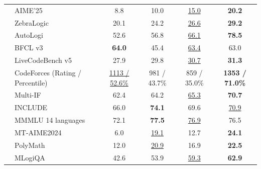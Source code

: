 \begin{table}[tbp]
{\begin{tabular}{@{}clcccc@{}}
& AIME'25 & 8.8 & 10.0 & \underline{15.0} & \textbf{20.2} \\
& ZebraLogic & 20.1 & 24.2 & \underline{26.6} & \textbf{29.2} \\
& AutoLogi & 52.6 & 56.8 & \underline{66.1} & \textbf{78.5} \\
\midrule
{} & BFCL v3 & \textbf{64.0} & 45.4 & \underline{63.4} & 63.0 \\
& LiveCodeBench v5 & 27.9 & 29.8 & \underline{30.7} & \textbf{31.3} \\
& CodeForces {\tiny{(Rating / Percentile)}} & \underline{1113 / 52.6\%} & 981 / 43.7\% & 859 / 35.0\% & \textbf{1353 / 71.0\%} \\
\midrule
{} & Multi-IF & 62.4 & 64.2 & \underline{65.3} & \textbf{70.7} \\
& INCLUDE & 66.0 & \textbf{74.1} & 69.6 & \underline{70.9} \\
& MMMLU {\tiny{14 languages}} & 72.1 & \textbf{77.5} & \underline{76.9} & 76.5 \\
& MT-AIME2024 & 6.0 & \underline{19.1} & 12.7 & \textbf{24.1} \\
& PolyMath & 12.0 & \underline{20.9} & 16.9 & \textbf{22.5} \\
& MLogiQA & 42.6 & 53.9 & \underline{59.3} & \textbf{62.9} \\
\bottomrule
\end{tabular}
}
\end{table}

